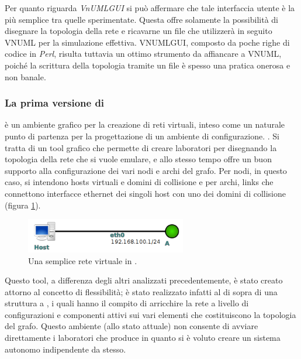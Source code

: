 Per quanto riguarda \emph{VnUMLGUI} si può affermare che tale interfaccia utente è la più semplice tra quelle sperimentate. Questa offre solamente la possibilità di disegnare la topologia della rete e ricavarne un file \xml{} che utilizzerà in seguito VNUML per la simulazione effettiva. VNUMLGUI, composto da poche righe di codice in \emph{Perl}, risulta tuttavia un ottimo strumento da affiancare a VNUML, poiché la scrittura della topologia tramite un file \xml{} è spesso una pratica onerosa e non banale.

\subsubsection{La prima versione di \visualnetkit{}}
\visualnetkit{} è un ambiente grafico per la creazione di reti virtuali, inteso come un naturale punto
di partenza per la progettazione di un ambiente di configurazione. \visualnetkit{}. Si tratta di un tool grafico che permette di creare laboratori per \netkit{} disegnando la topologia della rete che si vuole emulare, e allo stesso tempo offre un buon supporto alla configurazione dei vari nodi e archi del grafo. Per nodi, in questo caso, si intendono hosts virtuali e domini di collisione e per archi, links che connettono interfacce ethernet dei singoli host con uno dei domini di collisione (figura \ref{figura:vn_graph_1}).

\begin{figure}[!ht]
	\centering
	\includegraphics[width=7cm]{images/visualnetkit_graph_1.png}
	\caption{Una semplice rete virtuale in \visualnetkit{}.}
	\label{figura:vn_graph_1}
\end{figure}

Questo tool, a differenza degli altri analizzati precedentemente, è stato creato attorno al concetto di flessibilità; \visualnetkit{} è stato realizzato infatti al di sopra di una struttura a \plugin{}, i quali hanno il compito di arricchire la rete a livello di configurazioni e componenti attivi sui vari elementi che costituiscono la topologia del grafo. Questo ambiente (allo stato attuale) non consente di avviare direttamente i laboratori che produce in quanto si è voluto creare un sistema autonomo indipendente da \netkit{} stesso.

